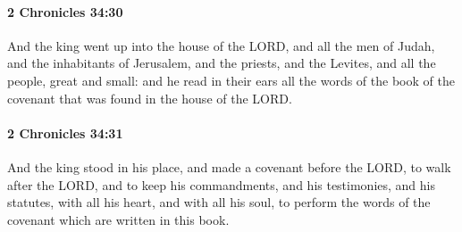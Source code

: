 		\paragraph{2 Chronicles 34:30} %
			\label{2CHRONICLES-34-30}

			And the king went up into the house of the LORD, and all the men of Judah, and the inhabitants of Jerusalem, and the priests, and the Levites, and all the people, great and small: and he read in their ears all the words of the book of the covenant that was found in the house of the LORD.


		\paragraph{2 Chronicles 34:31} %
			\label{2CHRONICLES-34-31}

			And the king stood in his place, and made a covenant before the LORD, to walk after the LORD, and to keep his commandments, and his testimonies, and his statutes, with all his heart, and with all his soul, to perform the words of the covenant which are written in this book.

